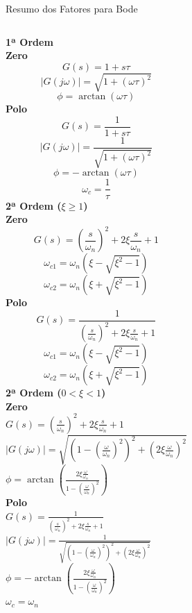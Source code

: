\begin{frame}{Resumo dos Fatores para Bode}
  \scriptsize
  \begin{columns}[t]
    \textbf{1ª Ordem}
    \vspace{1mm} \\
    \textbf{Zero}
    $$G(s)=1+s\tau$$
    $$|G(j\omega)|=\sqrt{1+(\omega\tau)^2}$$
    $$\phi=\arctan(\omega\tau)$$
    \vspace{1mm}
    \textbf{Polo}
    $$G(s)=\frac1{1+s\tau}$$
    $$|G(j\omega)|=\frac1{\sqrt{1+(\omega\tau)^2}}$$
    $$\phi=-\arctan(\omega\tau)$$
    $$\omega_c=\frac1\tau$$
    \textbf{2ª Ordem ($\xi\ge1$)}
    \vspace{1mm}\\
    \textbf{Zero}
    $$G(s)=\left(\frac{s}{\omega_n}\right)^2+2\xi\frac{s}{\omega_n}+1$$
    $$\omega_{c1}=\omega_n(\xi-\sqrt{\xi^2-1})$$
    $$\omega_{c2}=\omega_n(\xi+\sqrt{\xi^2-1})$$
    \vspace{1mm}
    \textbf{Polo}
    $$G(s)=\frac1{\left(\frac{s}{\omega_n}\right)^2+2\xi\frac{s}{\omega_n}+1}$$
    $$\omega_{c1}=\omega_n(\xi-\sqrt{\xi^2-1})$$
    $$\omega_{c2}=\omega_n(\xi+\sqrt{\xi^2-1})$$
    \textbf{2ª Ordem ($0<\xi<1$)}
    \vspace{1mm}\\
    \textbf{Zero}\\
    $G(s)=\left(\frac{s}{\omega_n}\right)^2+2\xi\frac{s}{\omega_n}+1$\\
    $|G(j\omega)|=\sqrt{\left(1-\left(\frac{\omega}{\omega_n}\right)^2\right)^2+\left(2\xi\frac{\omega}{\omega_n}\right)^2}$\\
    $\phi=\arctan\!\left(\frac{2\xi\frac{\omega}{\omega_n}}{1-\left(\frac{\omega}{\omega_n}\right)^2}\right)$
    \vspace{1mm}\\
    \textbf{Polo} \\
    $G(s)=\frac1{\left(\frac{s}{\omega_n}\right)^2+2\xi\frac{s}{\omega_n}+1}$\\
    $|G(j\omega)|=\frac1{\sqrt{\left(1-\left(\frac{\omega}{\omega_n}\right)^2\right)^2+\left(2\xi\frac{\omega}{\omega_n}\right)^2}}$\\
    $\phi=-\arctan\!\left(\frac{2\xi\frac{\omega}{\omega_n}}{1-\left(\frac{\omega}{\omega_n}\right)^2}\right)$ \\
    $\omega_c=\omega_n$
  \end{columns}
\end{frame}
